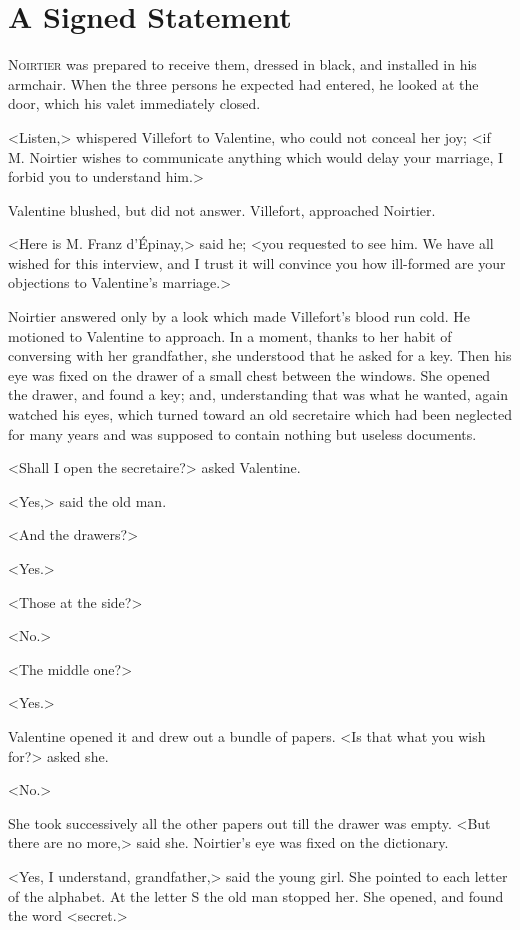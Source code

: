 \chapter{A Signed Statement} 

 \lettrine{N}{oirtier} was prepared to receive them, dressed in black, and installed in his armchair. When the three persons he expected had entered, he looked at the door, which his valet immediately closed. 

 <Listen,> whispered Villefort to Valentine, who could not conceal her joy; <if M. Noirtier wishes to communicate anything which would delay your marriage, I forbid you to understand him.> 

 Valentine blushed, but did not answer. Villefort, approached Noirtier. 

 <Here is M. Franz d'Épinay,> said he; <you requested to see him. We have all wished for this interview, and I trust it will convince you how ill-formed are your objections to Valentine's marriage.> 

 Noirtier answered only by a look which made Villefort's blood run cold. He motioned to Valentine to approach. In a moment, thanks to her habit of conversing with her grandfather, she understood that he asked for a key. Then his eye was fixed on the drawer of a small chest between the windows. She opened the drawer, and found a key; and, understanding that was what he wanted, again watched his eyes, which turned toward an old secretaire which had been neglected for many years and was supposed to contain nothing but useless documents. 

 <Shall I open the secretaire?> asked Valentine. 

 <Yes,> said the old man. 

 <And the drawers?> 

 <Yes.> 

 <Those at the side?> 

 <No.> 

 <The middle one?> 

 <Yes.> 

 Valentine opened it and drew out a bundle of papers. <Is that what you wish for?> asked she. 

 <No.> 

 She took successively all the other papers out till the drawer was empty. <But there are no more,> said she. Noirtier's eye was fixed on the dictionary. 

 <Yes, I understand, grandfather,> said the young girl.  She pointed to each letter of the alphabet. At the letter S the old man stopped her. She opened, and found the word <secret.> 

